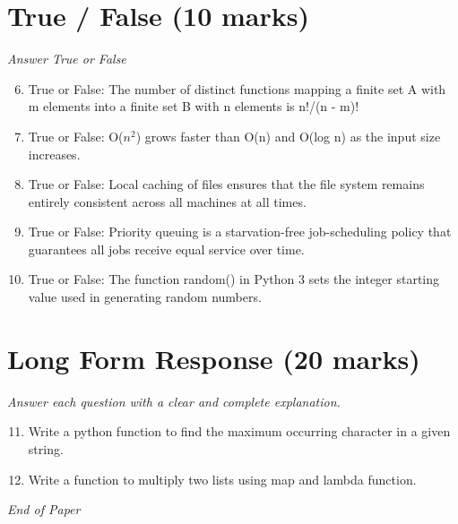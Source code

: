 \documentclass[12pt]{article}
\begin{document}
\section*{True / False (10 marks)}
\textit{Answer True or False}
\begin{enumerate}[label=\arabic*.]
\setcounter{enumi}{5}
\item True or False: The number of distinct functions mapping a finite set A with m elements into a finite set B with n elements is n!/(n - m)!
\item True or False: O($n^2$) grows faster than O(n) and O(log n) as the input size increases.
\item True or False: Local caching of files ensures that the file system remains entirely consistent across all machines at all times.
\item True or False: Priority queuing is a starvation-free job-scheduling policy that guarantees all jobs receive equal service over time.
\item True or False: The function random() in Python 3 sets the integer starting value used in generating random numbers.
\end{enumerate}

\section*{Long Form Response (20 marks)}
\textit{Answer each question with a clear and complete explanation.}
\begin{enumerate}[label=\arabic*.]
\setcounter{enumi}{10}
\item Write a python function to find the maximum occurring character in a given string.
\item Write a function to multiply two lists using map and lambda function.
\end{enumerate}

\vfill
\noindent\textit{End of Paper}
\end{document}

